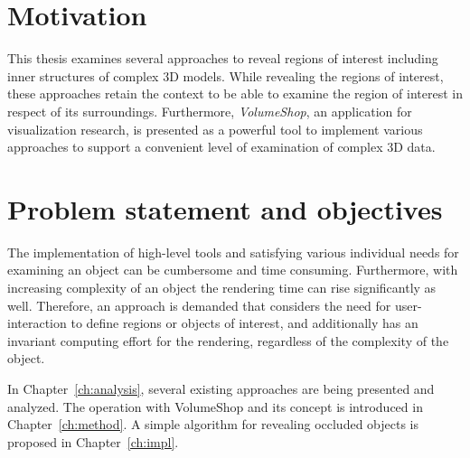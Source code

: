 \section{Motivation}
This thesis examines several approaches to reveal regions of interest including inner structures of complex 3D models. While revealing the regions of interest, these approaches retain the context to be able to examine the region of interest in respect of its surroundings. Furthermore, \emph{VolumeShop}, an application for visualization research, is presented as a powerful tool to implement various approaches to support a convenient level of examination of complex 3D data.

\section{Problem statement and objectives}
The implementation of high-level tools and satisfying various individual needs for examining an object can be cumbersome and time consuming. Furthermore, with increasing complexity of an object the rendering time can rise significantly as well. Therefore, an approach is demanded that considers the need for user-interaction to define regions or objects of interest, and additionally has an invariant computing effort for the rendering, regardless of the complexity of the object.

In Chapter~\ref{ch:analysis}, several existing approaches are being presented and analyzed. The operation with VolumeShop and its concept is introduced in Chapter~\ref{ch:method}. A simple algorithm for revealing occluded objects is proposed in Chapter~\ref{ch:impl}.
